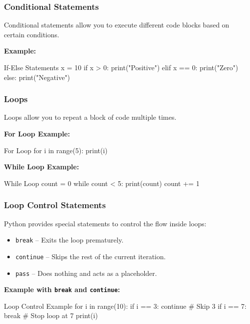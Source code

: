 \subsubsection{Conditional Statements}

Conditional statements allow you to execute different code blocks based on certain conditions.

\textbf{Example:}
\begin{codeonly}{If-Else Statements}
x = 10
if x > 0:
    print("Positive")
elif x == 0:
    print("Zero")
else:
    print("Negative")
\end{codeonly}

%
\subsubsection{Loops}

Loops allow you to repeat a block of code multiple times.

\textbf{For Loop Example:}
\begin{codeonly}{For Loop}
for i in range(5):
    print(i)
\end{codeonly}

\textbf{While Loop Example:}
\begin{codeonly}{While Loop}
count = 0
while count < 5:
    print(count)
    count += 1
\end{codeonly}

%
\subsubsection{Loop Control Statements}

Python provides special statements to control the flow inside loops:
\begin{itemize}
    \item \texttt{break} – Exits the loop prematurely.
    \item \texttt{continue} – Skips the rest of the current iteration.
    \item \texttt{pass} – Does nothing and acts as a placeholder.
\end{itemize}

\textbf{Example with \texttt{break} and \texttt{continue}:}
\begin{codeonly}{Loop Control Example}
for i in range(10):
    if i == 3:
        continue  # Skip 3
    if i == 7:
        break  # Stop loop at 7
    print(i)
\end{codeonly}

